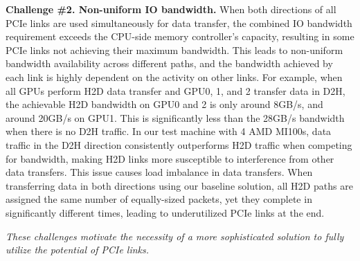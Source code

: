 \noindent 
\textbf{Challenge \#2. Non-uniform IO bandwidth.}
When both directions of all PCIe links are used simultaneously for data transfer, the combined IO bandwidth requirement exceeds the CPU-side memory controller's capacity, resulting in some PCIe links not achieving their maximum bandwidth. 
This leads to non-uniform bandwidth availability across different paths, and the bandwidth achieved by each link is highly dependent on the activity on other links.
For example, when all GPUs perform H2D data transfer and GPU0, 1, and 2 transfer data in D2H, the achievable H2D bandwidth on GPU0 and 2 is only around 8GB/s, and around 20GB/s on GPU1.
This is significantly less than the 28GB/s bandwidth when there is no D2H traffic.
In our test machine with 4 AMD MI100s, data traffic in the D2H direction consistently outperforms H2D traffic when competing for bandwidth, making H2D links more susceptible to interference from other data transfers.
This issue causes load imbalance in data transfers. 
When transferring data in both directions using our baseline solution, all H2D paths are assigned the same number of equally-sized packets, yet they complete in significantly different times, leading to underutilized PCIe links at the end. 

\noindent
\textit{These challenges motivate the necessity of a more sophisticated solution to fully utilize the potential of PCIe links.}

